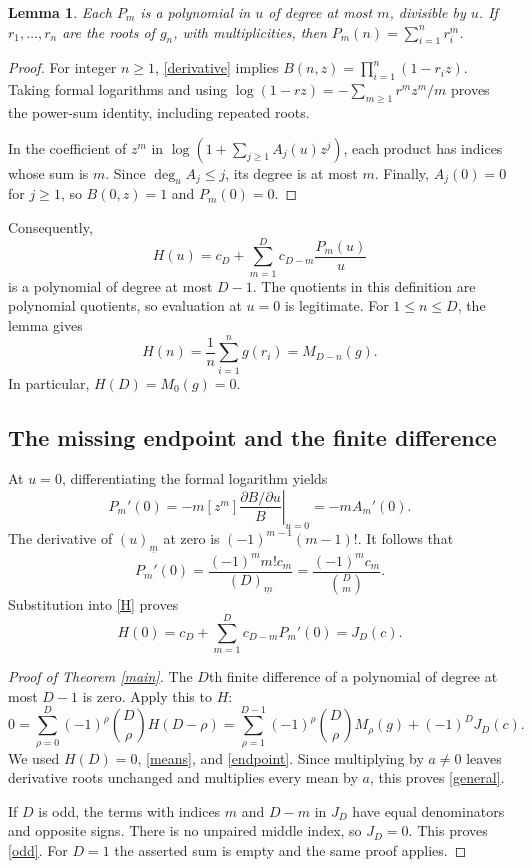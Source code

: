 \documentclass[11pt]{article}
\newtheorem{lemma}{Lemma}
\newcommand{\fall}[2]{(#1)_{\underline{#2}}}
\begin{document}
\begin{lemma}\label{powers}
Each $P_m$ is a polynomial in $u$ of degree at most $m$, divisible
by $u$. If $r_1,\ldots,r_n$ are the roots of $g_n$, with
multiplicities, then $P_m(n)=\sum_{i=1}^n r_i^m$.
\end{lemma}
\begin{proof}
For integer $n\geq1$, \eqref{derivative} implies
$B(n,z)=\prod_{i=1}^n(1-r_i z)$. Taking formal logarithms and
using $\log(1-rz)=-\sum_{m\geq1}r^mz^m/m$ proves the power-sum
identity, including repeated roots.

In the coefficient of $z^m$ in
$\log(1+\sum_{j\geq1}A_j(u)z^j)$, each product has indices
whose sum is $m$. Since $\deg_u A_j\leq j$, its degree is at
most $m$. Finally, $A_j(0)=0$ for $j\geq1$, so $B(0,z)=1$
and $P_m(0)=0$.
\end{proof}

Consequently,
\begin{equation}\label{H}
 H(u)=c_D+\sum_{m=1}^D c_{D-m}\frac{P_m(u)}u
\end{equation}
is a polynomial of degree at most $D-1$. The quotients in this
definition are polynomial quotients, so evaluation at $u=0$ is
legitimate. For $1\leq n\leq D$, the lemma gives
\begin{equation}\label{means}
 H(n)=\frac1n\sum_{i=1}^n g(r_i)=M_{D-n}(g).
\end{equation}
In particular, $H(D)=M_0(g)=0$.

\subsection*{The missing endpoint and the finite difference}
At $u=0$, differentiating the formal logarithm yields
\[
 P_m'(0)=-m[z^m]\left.\frac{\partial B/\partial u}{B}\right|_{u=0}
        =-m A_m'(0).
\]
The derivative of $\fall um$ at zero is
$(-1)^{m-1}(m-1)!$. It follows that
\[
 P_m'(0)=\frac{(-1)^m m!c_m}{\fall Dm}
        =\frac{(-1)^m c_m}{\binom Dm}.
\]
Substitution into \eqref{H} proves
\begin{equation}\label{endpoint}
 H(0)=c_D+\sum_{m=1}^D c_{D-m}P_m'(0)=J_D(c).
\end{equation}

\begin{proof}[Proof of Theorem \ref{main}]
The $D$th finite difference of a polynomial of degree at most
$D-1$ is zero. Apply this to $H$:
\[
 0=\sum_{\rho=0}^D(-1)^\rho\binom D\rho H(D-\rho)
  =\sum_{\rho=1}^{D-1}(-1)^\rho\binom D\rho M_\rho(g)
    +(-1)^D J_D(c).
\]
We used $H(D)=0$, \eqref{means}, and \eqref{endpoint}.
Since multiplying by $a\ne0$ leaves derivative roots unchanged
and multiplies every mean by $a$, this proves \eqref{general}.

If $D$ is odd, the terms with indices $m$ and $D-m$ in $J_D$
have equal denominators and opposite signs. There is no unpaired
middle index, so $J_D=0$. This proves \eqref{odd}. For $D=1$
the asserted sum is empty and the same proof applies.
\end{proof}
\end{document}
